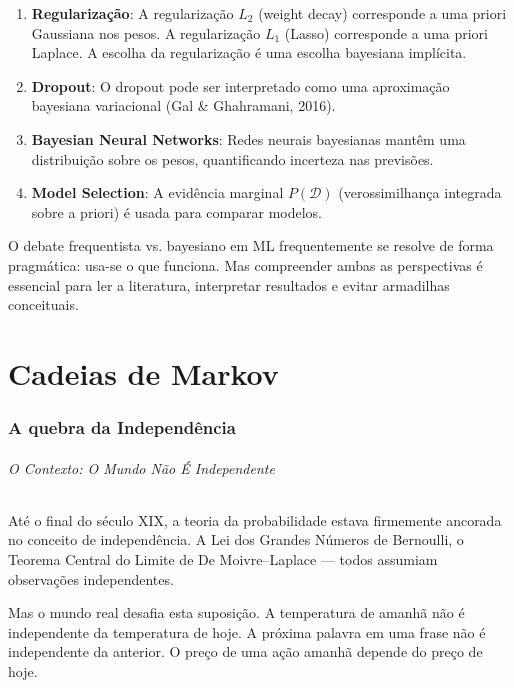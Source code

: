 \documentclass{tufte-handout}
\begin{document}
\begin{enumerate}
    \item \textbf{Regularização}: A regularização $L_2$ (weight decay) corresponde a uma
    priori Gaussiana nos pesos. A regularização $L_1$ (Lasso) corresponde a uma priori
    Laplace. A escolha da regularização é uma escolha bayesiana implícita.
    \item \textbf{Dropout}: O dropout pode ser interpretado como uma aproximação
    bayesiana variacional (Gal \& Ghahramani, 2016).
    \item \textbf{Bayesian Neural Networks}: Redes neurais bayesianas mantêm uma
    distribuição sobre os pesos, quantificando incerteza nas previsões.
    \item \textbf{Model Selection}: A evidência marginal $P(\mathcal{D})$ (verossimilhança
    integrada sobre a priori) é usada para comparar modelos.
\end{enumerate}

O debate frequentista vs. bayesiano em ML frequentemente se resolve de forma pragmática:
usa-se o que funciona. Mas compreender ambas as perspectivas é essencial para ler a literatura,
interpretar resultados e evitar armadilhas conceituais.


\part{Cadeias de Markov}

\section{A quebra da Independência}

\paragraph{O Contexto: O Mundo Não É Independente}

Até o final do século XIX, a teoria da probabilidade estava firmemente ancorada no conceito
de independência. A Lei dos Grandes Números de Bernoulli, o Teorema Central do Limite de
De Moivre--Laplace --- todos assumiam observações independentes.

Mas o mundo real desafia esta suposição. A temperatura de amanhã não é independente da
temperatura de hoje. A próxima palavra em uma frase não é independente da anterior.
O preço de uma ação amanhã depende do preço de hoje.
\end{document}
